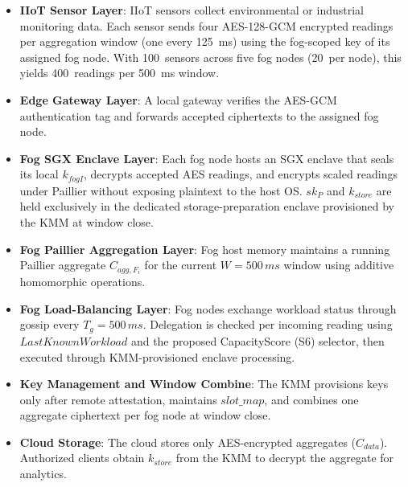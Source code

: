 \documentclass[conference]{IEEEtran}
\begin{document}
    \begin{itemize}
        \item \textbf{IIoT Sensor Layer}: IIoT sensors collect environmental or industrial monitoring data. Each sensor sends four AES-128-GCM encrypted readings per aggregation window (one every 125~ms) using the fog-scoped key of its assigned fog node. With 100~sensors across five fog nodes (20~per node), this yields 400~readings per 500~ms window.
        \item \textbf{Edge Gateway Layer}: A local gateway verifies the AES-GCM authentication tag and forwards accepted ciphertexts to the assigned fog node.
        \item \textbf{Fog SGX Enclave Layer}: Each fog node hosts an SGX enclave that seals its local $k_{fogI}$, decrypts accepted AES readings, and encrypts scaled readings under Paillier without exposing plaintext to the host OS. $sk_P$ and $k_{store}$ are held exclusively in the dedicated storage-preparation enclave provisioned by the KMM at window close.
        \item \textbf{Fog Paillier Aggregation Layer}: Fog host memory maintains a running Paillier aggregate $C_{agg,F_i}$ for the current $W=500\,ms$ window using additive homomorphic operations.
        \item \textbf{Fog Load-Balancing Layer}: Fog nodes exchange workload status through gossip every $T_g=500\,ms$. Delegation is checked per incoming reading using $LastKnownWorkload$ and the proposed CapacityScore (S6) selector, then executed through KMM-provisioned enclave processing.
        \item \textbf{Key Management and Window Combine}: The KMM provisions keys only after remote attestation, maintains $slot\_map$, and combines one aggregate ciphertext per fog node at window close.
        \item \textbf{Cloud Storage}: The cloud stores only AES-encrypted aggregates ($C_{data}$). Authorized clients obtain $k_{store}$ from the KMM to decrypt the aggregate for analytics.
    \end{itemize}
\end{document}
